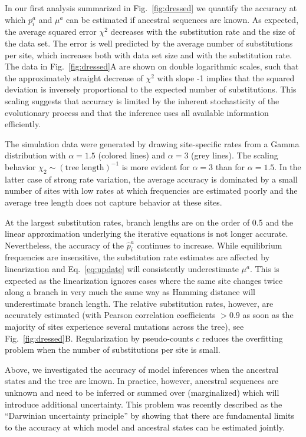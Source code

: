 \documentclass[aps,rmp,twocolumn,linenumbers]{revtex4-1}
\newcommand{\eqp}{p}
\newcommand{\pc}{c}
\begin{document}
In our first analysis summarized in Fig.~\ref{fig:dressed} we quantify the accuracy at which $\eqp_i^a$ and $\mu^a$ can be estimated if ancestral sequences are known.
As expected, the average squared error $\chi^2$ decreases with the substitution rate and the size of the data set.
The error is well predicted by the average number of substitutions per site, which increases both with data set size and with the substitution rate.
The data in Fig.~\ref{fig:dressed}A are shown on double logarithmic scales, such that the approximately straight decrease of $\chi^2$ with slope -1 implies that the squared deviation is inversely proportional to the expected number of substitutions.
This scaling suggests that accuracy is limited by the inherent stochasticity of the evolutionary process and that the inference uses all available information efficiently.

The simulation data were generated by drawing site-specific rates from a Gamma distribution with $\alpha=1.5$ (colored lines) and $\alpha=3$ (grey lines).
The scaling behavior $\chi_2 \sim (\textrm{tree length})^{-1}$ is more evident for $\alpha=3$ than for $\alpha=1.5$.
In the latter case of strong rate variation, the average accuracy is dominated by a small number of sites with low rates at which frequencies are estimated poorly and the average tree length does not capture behavior at these sites.

At the largest substitution rates, branch lengths are on the order of 0.5 and the linear approximation underlying the iterative equations is not longer accurate.
Nevertheless, the accuracy of the $\hat{\eqp}_i^a$ continues to increase.
While equilibrium frequencies are insensitive, the substitution rate estimates are affected by linearization and Eq.~\ref{eq:update} will consistently underestimate $\mu^a$.
This is expected as the linearization ignores cases where the same site changes twice along a branch in very much the same way as Hamming distance will underestimate branch length.
The relative substitution rates, however, are accurately estimated (with Pearson correlation coefficients $>0.9$ as soon as the majority of sites experience several mutations across the tree), see Fig.~\ref{fig:dressed}B.
Regularization by pseudo-counts $\pc$ reduces the overfitting problem when the number of substitutions per site is small.

Above, we investigated the accuracy of model inferences when the ancestral states and the tree are known.
In practice, however, ancestral sequences are unknown and need to be inferred or summed over (marginalized) which will introduce additional uncertainty.
This problem was recently described as the ``Darwinian uncertainty principle'' by \citet{gascuel_darwinian_2020} showing that there are fundamental limits to the accuracy at which  model and ancestral states can be estimated jointly.
\end{document}
